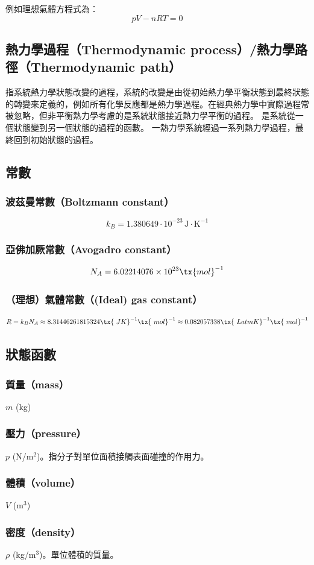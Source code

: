\documentclass[a4paper,12pt]{report}
\begin{document}
例如理想氣體方程式為：
\[pV-nRT=0\]
\subsection{熱力學過程（Thermodynamic process）/熱力學路徑（Thermodynamic path）}
指系統熱力學狀態改變的過程，系統的改變是由從初始熱力學平衡狀態到最終狀態的轉變來定義的，例如所有化學反應都是熱力學過程。在經典熱力學中實際過程常被忽略，但非平衡熱力學考慮的是系統狀態接近熱力學平衡的過程。
是系統從一個狀態變到另一個狀態的過程的函數。
一熱力學系統經過一系列熱力學過程，最終回到初始狀態的過程。
\subsection{常數}
\subsubsection{波茲曼常數（Boltzmann constant）}
\[k_B=1.380649\cdot 10^{-23}\,\text{J}\cdot\text{K}^{-1}\]
\subsubsection{亞佛加厥常數（Avogadro constant）}
\[N_A=6.02214076\times 10^{23} \tx{ mol}^{-1}\]
\subsubsection{（理想）氣體常數（(Ideal) gas constant）}
\[R=k_BN_A \approx 8.31446261815324 \tx{\ J K}^{-1}\tx{\ mol}^{-1}\approx 0.082057338 \tx{\ L atm K}^{-1}\tx{\ mol}^{-1}\]
\subsection{狀態函數}
\subsubsection{質量（mass）}
$m$ (kg)
\subsubsection{壓力（pressure）}
$p$ (N/m$^2$)。指分子對單位面積接觸表面碰撞的作用力。
\subsubsection{體積（volume）}
$V$ (m$^3$)
\subsubsection{密度（density）}
\(\rho\) (kg/m\(^3\))。單位體積的質量。
\end{document}
